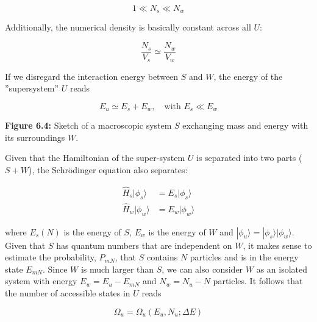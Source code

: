 \documentclass[12pt,a4paper]{report}
\newcommand{\esp}{\vspace{0.5cm}}
\begin{document}
	\esp
	
	\begin{equation}
		1 \ll N_s \ll N_w \tag{6.9}
	\end{equation}
	
	\esp
	
	\noindent Additionally, the numerical density is basically constant across all $U$:
	
	\esp
	
	\begin{equation}
		\frac{N_s}{V_s} \simeq \frac{N_w}{V_w} \tag{6.10}
	\end{equation}
	
	\esp
	
	If we disregard the interaction energy between $S$ and $W$, the energy of the ''supersystem'' $U$ reads
	
	\esp
	
	
	\begin{equation}
		E_u \simeq E_s + E_w, \quad \text{with } E_s \ll E_w \tag{6.11}
	\end{equation}
	
	\esp
	
	\textbf{Figure 6.4:} Sketch of a macroscopic system $S$ exchanging mass and energy with its surroundings $W$.
	
	\esp
	
	Given that the Hamiltonian of the super-system $U$ is separated into two parts ($S + W$), the Schrödinger equation also separates:
	
	\esp
	
	\begin{align}
		\hat{H}_s |\phi_s\rangle &= E_s |\phi_s\rangle \tag{6.12} \\
		\hat{H}_w |\phi_w\rangle &= E_w |\phi_w\rangle \tag{6.13}
	\end{align}
	
	\esp
	
	where $E_s(N)$ is the energy of $S$, $E_w$ is the energy of $W$ and $|\phi_u\rangle = |\phi_s\rangle|\phi_w\rangle$. Given that $S$ has quantum numbers that are independent on $W$, it makes sense to estimate the probability, $P_{mN}$, that $S$ contains $N$ particles and is in the energy state $E_{mN}$. Since $W$ is much larger than $S$, we can also consider $W$ as an isolated system with energy $E_w = E_u - E_{mN}$ and $N_w = N_u - N$ particles. It follows that the number of accessible states in $U$ reads
	
	\esp
	
	\begin{equation}
		\Omega_u = \Omega_u(E_u, N_u; \Delta E) \tag{6.14}
	\end{equation}
	
\end{document}
